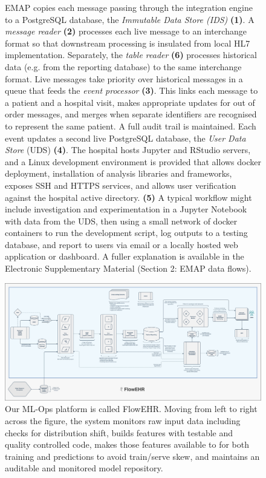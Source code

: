 \documentclass[utf8]{FrontiersinVancouver}
\begin{document}
\begin{figure}[h!]
{EMAP copies each message passing through the integration engine to a PostgreSQL database, the \textit{Immutable Data Store (IDS)} \textbf{(1)}. A \textit{message reader} \textbf{(2)} processes each live message to an interchange format so that downstream processing is insulated from local HL7 implementation. Separately, the \textit{table reader} \textbf{(6)} processes historical data (e.g. from the reporting database) to the same interchange format. Live messages take priority over historical messages in a queue that feeds the \textit{event processor} \textbf{(3)}. This links each message to a patient and a hospital visit, makes appropriate updates for out of order messages, and merges when separate identifiers are recognised to represent the same patient. A full audit trail is maintained. Each event updates a second live PostgreSQL database, the \textit{User Data Store} (UDS) \textbf{(4)}. The hospital hosts Jupyter and RStudio servers, and a Linux development environment is provided that allows docker deployment, installation of analysis libraries and frameworks, exposes SSH and HTTPS services, and allows user verification against the hospital active directory. \textbf{(5)} A typical workflow might include investigation and experimentation in a Jupyter Notebook with data from the UDS, then using a small network of docker containers to run the development script, log outputs to a testing database, and report to users via email or a locally hosted web application or dashboard.  A fuller explanation is available in the Electronic Supplementary Material (Section 2: EMAP data flows).}\label{fig:1}
\end{figure}


\begin{figure}[h!]
\begin{center}
\includegraphics[width=15cm]{assets/flowehr.png}
\end{center}
\caption{
Our ML-Ops platform is called FlowEHR. Moving from left to right across the figure, the system monitors raw input data including checks for distribution shift, builds features with testable and quality controlled code, makes those features available to for both training and predictions to avoid train/serve skew, and maintains an auditable and monitored model repository.}\label{fig:2}
\end{figure}
\end{document}
